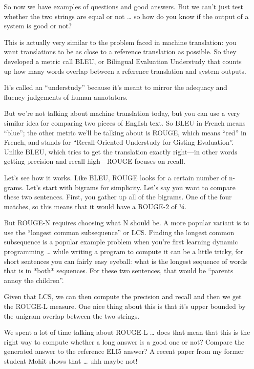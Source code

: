 So now we have examples of questions and good answers.  But we can’t just test whether the two strings are equal or not … so how do you know if the output of a system is good or not?

This is actually very similar to the problem faced in machine translation: you want translations to be as close to a reference translation as possible.  So they developed a metric call BLEU, or Bilingual Evaluation Understudy that counts up how many words overlap between a reference translation and system outputs.

It’s called an “understudy” because it’s meant to mirror the adequacy and fluency judgements of human annotators.  

But we’re not talking about machine translation today, but you can use a very similar idea for comparing two pieces of English text.  So BLEU in French means “blue”; the other metric we’ll be talking about is ROUGE, which means “red” in French, and stands for “Recall-Oriented Understudy for Gisting Evaluation”.  Unlike BLEU, which tries to get the translation exactly right—in other words getting precision and recall high—ROUGE focuses on recall.  

Let’s see how it works.   Like BLEU, ROUGE looks for a certain number of n-grams.  Let’s start with bigrams for simplicity.  Let’s say you want to compare these two sentences.  First, you gather up all of the bigrams.  One of the four matches, so this means that it would have a ROUGE-2 of ¼.  

But ROUGE-N requires choosing what N should be.  A more popular variant is to use the “longest common subsequence” or LCS.  Finding the longest common subsequence is a popular example problem when you’re first learning dynamic programming … while writing a program to compute it can be a little tricky, for short sentences you can fairly easy eyeball: what is the longest sequence of words that is in *both* sequences.  For these two sentences, that would be “parents annoy the children”.  

Given that LCS, we can then compute the precision and recall and then we get the ROUGE-L measure.  One nice thing about this is that it’s upper bounded by the unigram overlap between the two strings.

We spent a lot of time talking about ROUGE-L … does that mean that this is the right way to compute whether a long answer is a good one or not?  Compare the generated answer to the reference ELI5 answer?  A recent paper from my former student Mohit shows that … uhh maybe not!

